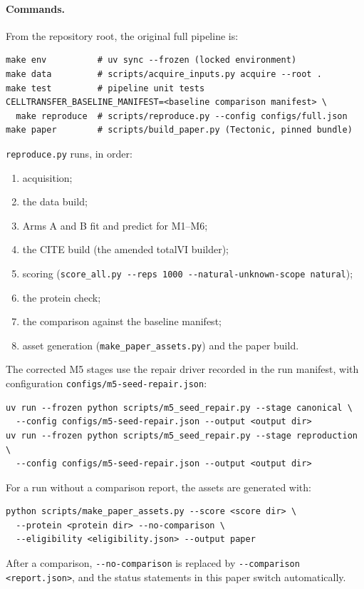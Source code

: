 \documentclass[11pt]{article}
\begin{document}
\paragraph{Commands.} From the repository root, the original full pipeline is:
\begin{verbatim}
make env          # uv sync --frozen (locked environment)
make data         # scripts/acquire_inputs.py acquire --root .
make test         # pipeline unit tests
CELLTRANSFER_BASELINE_MANIFEST=<baseline comparison manifest> \
  make reproduce  # scripts/reproduce.py --config configs/full.json
make paper        # scripts/build_paper.py (Tectonic, pinned bundle)
\end{verbatim}
\texttt{reproduce.py} runs, in order:
\begin{enumerate}
\item acquisition;
\item the data build;
\item Arms A and B fit and predict for M1--M6;
\item the CITE build (the amended totalVI builder);
\item scoring (\verb|score_all.py --reps 1000 --natural-unknown-scope natural|);
\item the protein check;
\item the comparison against the baseline manifest;
\item asset generation (\nolinkurl{make_paper_assets.py}) and the paper build.
\end{enumerate}
The corrected M5 stages use the repair driver recorded in the run manifest, with configuration \nolinkurl{configs/m5-seed-repair.json}:
\begin{verbatim}
uv run --frozen python scripts/m5_seed_repair.py --stage canonical \
  --config configs/m5-seed-repair.json --output <output dir>
uv run --frozen python scripts/m5_seed_repair.py --stage reproduction \
  --config configs/m5-seed-repair.json --output <output dir>
\end{verbatim}
For a run without a comparison report, the assets are generated with:
\begin{verbatim}
python scripts/make_paper_assets.py --score <score dir> \
  --protein <protein dir> --no-comparison \
  --eligibility <eligibility.json> --output paper
\end{verbatim}
After a comparison, \verb|--no-comparison| is replaced by \verb|--comparison <report.json>|, and the status statements in this paper switch automatically.
\end{document}
